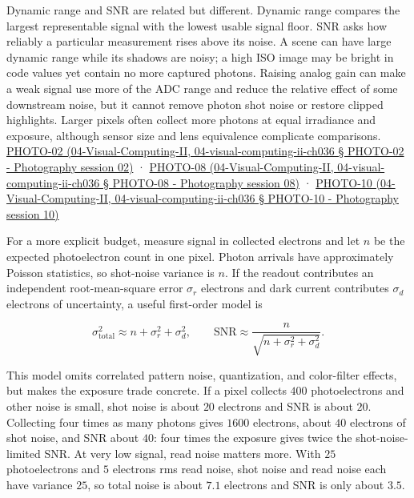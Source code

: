 Dynamic range and SNR are related but different. Dynamic range compares the largest representable signal with the lowest usable signal floor. SNR asks how reliably a particular measurement rises above its noise. A scene can have large dynamic range while its shadows are noisy; a high ISO image may be bright in code values yet contain no more captured photons. Raising analog gain can make a weak signal use more of the ADC range and reduce the relative effect of some downstream noise, but it cannot remove photon shot noise or restore clipped highlights. Larger pixels often collect more photons at equal irradiance and exposure, although sensor size and lens equivalence complicate comparisons. \href{}{PHOTO-02 (04-Visual-Computing-II, 04-visual-computing-ii-ch036 § PHOTO-02 - Photography session 02)} · \href{}{PHOTO-08 (04-Visual-Computing-II, 04-visual-computing-ii-ch036 § PHOTO-08 - Photography session 08)} · \href{}{PHOTO-10 (04-Visual-Computing-II, 04-visual-computing-ii-ch036 § PHOTO-10 - Photography session 10)}

For a more explicit budget, measure signal in collected electrons and let \(n\) be the expected photoelectron count in one pixel. Photon arrivals have approximately Poisson statistics, so shot-noise variance is \(n\). If the readout contributes an independent root-mean-square error \(\sigma_r\) electrons and dark current contributes \(\sigma_d\) electrons of uncertainty, a useful first-order model is

\[
\sigma_{\mathrm{total}}^2\approx n+\sigma_r^2+\sigma_d^2,
\qquad
\mathrm{SNR}\approx\frac{n}{\sqrt{n+\sigma_r^2+\sigma_d^2}}.
\]

This model omits correlated pattern noise, quantization, and color-filter effects, but makes the exposure trade concrete. If a pixel collects \(400\) photoelectrons and other noise is small, shot noise is about \(20\) electrons and SNR is about \(20\). Collecting four times as many photons gives \(1600\) electrons, about \(40\) electrons of shot noise, and SNR about \(40\): four times the exposure gives twice the shot-noise-limited SNR. At very low signal, read noise matters more. With \(25\) photoelectrons and \(5\) electrons rms read noise, shot noise and read noise each have variance \(25\), so total noise is about \(7.1\) electrons and SNR is only about \(3.5\).

